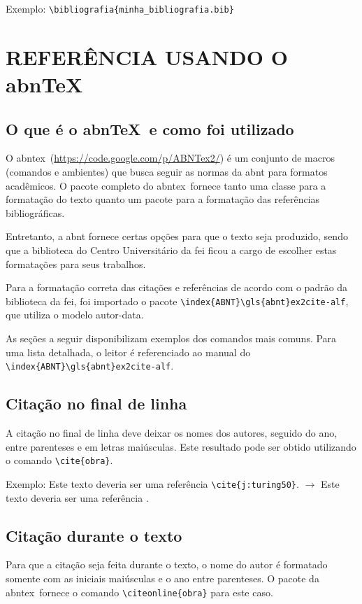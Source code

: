 \documentclass{fei}
\begin{document}
    Exemplo: \verb+\bibliografia{minha_bibliografia.bib}+

\chapter{REFERÊNCIA USANDO O abn\TeX}\label{chap:referencia}

    \section{O que é o abn\TeX~e como foi utilizado}

    O \gls{abntex}~(\href{https://code.google.com/p/ABNTex2/}{https://code.google.com/p/ABNTex2/}) é um conjunto de macros (comandos e ambientes) que busca seguir as normas da \gls{abnt} para formatos acadêmicos. O pacote completo do \gls{abntex}~fornece tanto uma classe para a formatação do texto quanto um pacote para a formatação das referências bibliográficas.

    Entretanto, a \gls{abnt} fornece certas opções para que o texto seja produzido, sendo que a biblioteca do Centro Universitário da \gls{fei} ficou a cargo de escolher estas formatações para seus trabalhos.

    Para a formatação correta das citações e referências de acordo com o padrão da biblioteca da \gls{fei}, foi importado o pacote \verb+\index{ABNT}\gls{abnt}ex2cite-alf+, que utiliza o modelo autor-data.

    As seções a seguir disponibilizam exemplos dos comandos mais comuns. Para uma lista detalhada, o leitor é referenciado ao manual do \verb+\index{ABNT}\gls{abnt}ex2cite-alf+.

    \section{Citação no final de linha}
    A citação no final de linha deve deixar os nomes dos autores, seguido do ano, entre parenteses e em letras maiúsculas. Este resultado pode ser obtido utilizando o comando \verb+\cite{obra}+.

    Exemplo: Este texto deveria ser uma referência \verb+\cite{j:turing50}+. $\to$ Este texto deveria ser uma referência \cite{j:turing50}.

    \section{Citação durante o texto}
    Para que a citação seja feita durante o texto, o nome do autor é formatado somente com as iniciais maiúsculas e o ano entre parenteses. O pacote da \gls{abntex}~fornece o comando \verb+\citeonline{obra}+ para este caso.
\end{document}
